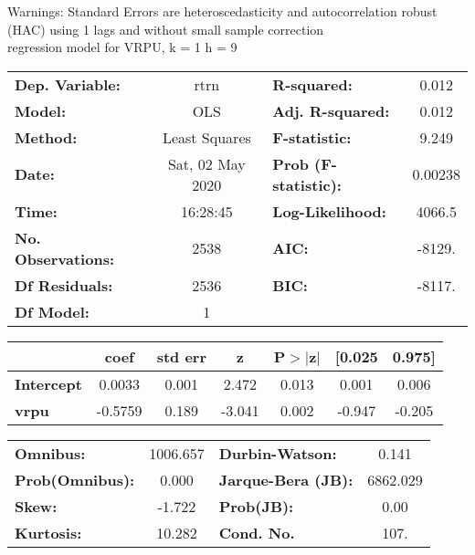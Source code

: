 Warnings: \newline
 [1] Standard Errors are heteroscedasticity and autocorrelation robust (HAC) using 1 lags and without small sample correction\\ 

regression model for VRPU, k = 1 h = 9\begin{center}
\begin{tabular}{lclc}
\toprule
\textbf{Dep. Variable:}    &       rtrn       & \textbf{  R-squared:         } &     0.012   \\
\textbf{Model:}            &       OLS        & \textbf{  Adj. R-squared:    } &     0.012   \\
\textbf{Method:}           &  Least Squares   & \textbf{  F-statistic:       } &     9.249   \\
\textbf{Date:}             & Sat, 02 May 2020 & \textbf{  Prob (F-statistic):} &  0.00238    \\
\textbf{Time:}             &     16:28:45     & \textbf{  Log-Likelihood:    } &    4066.5   \\
\textbf{No. Observations:} &        2538      & \textbf{  AIC:               } &    -8129.   \\
\textbf{Df Residuals:}     &        2536      & \textbf{  BIC:               } &    -8117.   \\
\textbf{Df Model:}         &           1      & \textbf{                     } &             \\
\bottomrule
\end{tabular}
\begin{tabular}{lcccccc}
                   & \textbf{coef} & \textbf{std err} & \textbf{z} & \textbf{P$> |$z$|$} & \textbf{[0.025} & \textbf{0.975]}  \\
\midrule
\textbf{Intercept} &       0.0033  &        0.001     &     2.472  &         0.013        &        0.001    &        0.006     \\
\textbf{vrpu}      &      -0.5759  &        0.189     &    -3.041  &         0.002        &       -0.947    &       -0.205     \\
\bottomrule
\end{tabular}
\begin{tabular}{lclc}
\textbf{Omnibus:}       & 1006.657 & \textbf{  Durbin-Watson:     } &    0.141  \\
\textbf{Prob(Omnibus):} &   0.000  & \textbf{  Jarque-Bera (JB):  } & 6862.029  \\
\textbf{Skew:}          &  -1.722  & \textbf{  Prob(JB):          } &     0.00  \\
\textbf{Kurtosis:}      &  10.282  & \textbf{  Cond. No.          } &     107.  \\
\bottomrule
\end{tabular}
\end{center}

